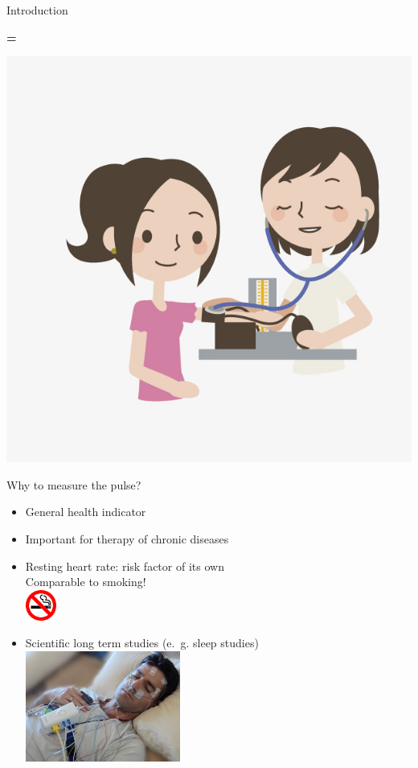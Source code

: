 \documentclass{beamer}
\begin{document}
\begin{frame}{Introduction}
\begin{minipage}[c]{0.25\textwidth}
	\end{minipage}
	\textbf{\huge{=}}
	\begin{minipage}[c]{0.3\textwidth}
		\includegraphics[width=\textwidth]{pulse_measurement}
	\end{minipage}
\end{frame}

\begin{frame}{Why to measure the pulse?}
\begin{itemize}
	\item General health indicator \pause
	\item Important for therapy of chronic diseases \pause
	\item Resting heart rate: risk factor of its own\\ \pause
		Comparable to smoking!\\
		\includegraphics[width=1cm]{No_Smoking} \pause
	\item Scientific long term studies (e.~g. sleep studies)\\
		\includegraphics[width=0.4\textwidth]{Sleep-lab-facilities.jpg}
\end{itemize}
\end{frame}
\end{document}

